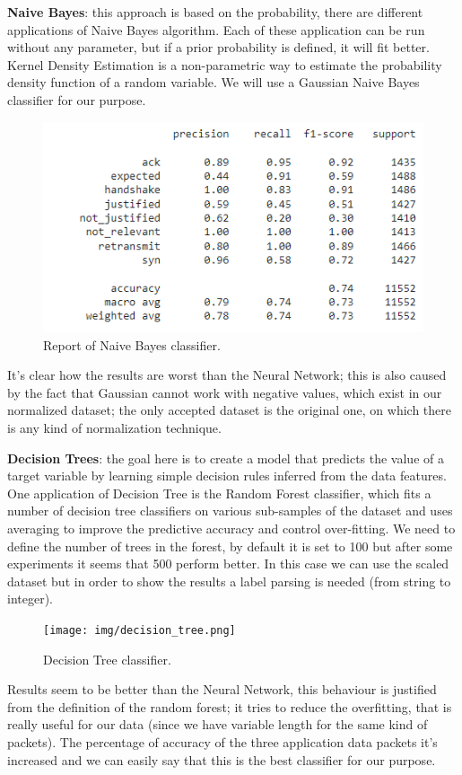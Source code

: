 \documentclass[sigconf]{acmart}
\begin{document}
    \textbf{Naive Bayes}: this approach is based on the probability, there are different applications of Naive Bayes algorithm. Each of these application can be run without any parameter, but if a prior probability is defined, it will fit better. Kernel Density Estimation is a non-parametric way to estimate the probability density function of a random variable. We will use a Gaussian Naive Bayes classifier for our purpose.
    \begin{figure}[h!]
        \includegraphics[width=\linewidth]{img/nb_classifier.png}
        \caption{Report of Naive Bayes classifier.}
        \label{fig:nb_classifier}
    \end{figure}
    It's clear how the results are worst than the Neural Network; this is also caused by the fact that Gaussian cannot work with negative values, which exist in our normalized dataset; the only accepted dataset is the original one, on which there is any kind of normalization technique.

    \textbf{Decision Trees}: the goal here is to create a model that predicts the value of a target variable by learning simple decision rules inferred from the data features. One application of Decision Tree is the Random Forest classifier, which fits a number of decision tree classifiers on various sub-samples of the dataset and uses averaging to improve the predictive accuracy and control over-fitting. We need to define the number of trees in the forest, by default it is set to 100 but after some experiments it seems that 500 perform better.
In this case we can use the scaled dataset but in order to show the results a label parsing is needed (from string to integer).
    \begin{figure}[h!]
        \texttt{[image: img/decision\_tree.png]}
        \caption{Decision Tree classifier.}
        \label{fig:decision_tree}
    \end{figure}
Results seem to be better than the Neural Network, this behaviour is justified from the definition of the random forest; it tries to reduce the overfitting, that is really useful for our data (since we have variable length for the same kind of packets). The percentage of accuracy of the three application data packets it's increased and we can easily say that this is the best classifier for our purpose.
\end{document}
